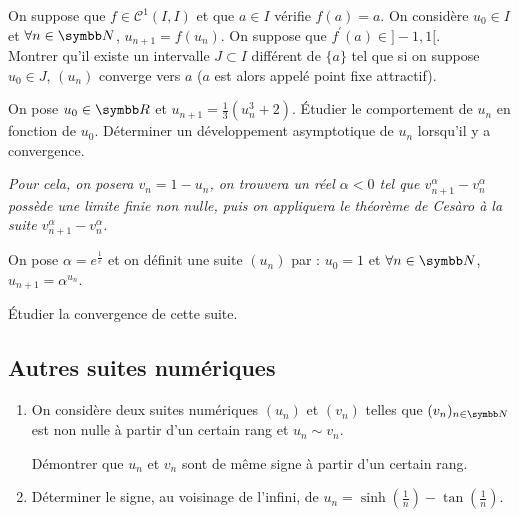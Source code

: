 \begin{exercice}
    On suppose que $f\in \mathscr C^{1}(I,I)$ et que $a\in I$ vérifie $f(a)=a$.
    On considère $u_{0}\in I$ et $\forall n\in\N$, $u_{n+1}=f(u_{n})$.
    On suppose que $f^{\prime}(a)\in]-1,1[$. \\

    Montrer qu'il existe un intervalle $J\subset I$ différent de $\{a\}$ tel que si on suppose $u_{0}\in J$,
    $(u_n)$ converge vers $a$ ($a$ est alors appelé point fixe attractif).
\end{exercice}

\begin{exercice}
    On pose $u_{0}\in\R$ et $u_{n+1}=\frac{1}{3}(u_{n}^{3}+2)$.
    Étudier le comportement de $u_{n}$ en fonction de $u_{0}$.
    Déterminer un développement asymptotique de $u_{n}$ lorsqu'il y a convergence.

    \textit{Pour cela, on posera $v_{n}=1-u_{n}$, on trouvera un réel $\alpha<0$ tel que $v_{n+1}^{\alpha}-v_{n}^{\alpha}$ possède une limite finie non nulle, 
    puis on appliquera le théorème de Cesàro à la suite $v_{n+1}^{\alpha}-v_{n}^{\alpha}$.}
\end{exercice}

\begin{exercice}
    On pose $\alpha=e^{\frac 1 e}$ et on définit une suite $(u_{n})$ par :
    $u_{0}=1$ et $\forall n\in\N$, $u_{n+1}=\alpha^{u_{n}}$.

    Étudier la convergence de cette suite.
\end{exercice}

\newpage
\subsection{Autres suites numériques}
\begin{exercice}
\begin{enumerate}
    \item On considère deux suites numériques $(u_{n})$ et $(v_{n})$ 
        telles que $(v_{n})_{n\in\N}$ est non nulle à partir d'un certain rang et $u_{n}\sim v_{n}$.
        
        Démontrer que $u_{n}$ et $v_{n}$ sont de même signe à partir d'un certain rang.

    \item Déterminer le signe, au voisinage de l'infini, de $u_{n}=\sinh\left(\frac{1}{n}\right)-\tan\left(\frac{1}{n}\right)$.
\end{enumerate}
\end{exercice}

